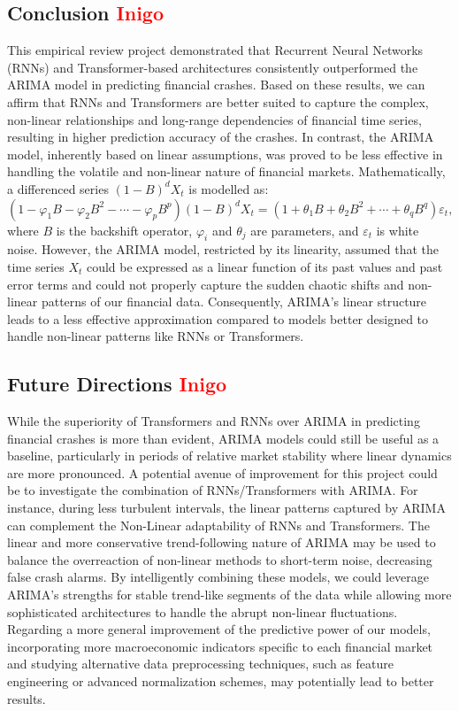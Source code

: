 \documentclass[12pt, letterpaper]{article}
\begin{document}
\subsection*{Conclusion \textcolor{red}{Inigo}}
This empirical review project demonstrated that Recurrent Neural Networks (RNNs) and Transformer-based architectures consistently outperformed the ARIMA model in predicting financial crashes. Based on these results, we can affirm that RNNs and Transformers are better suited to capture the complex, non-linear relationships and long-range dependencies of financial time series, resulting in higher prediction accuracy of the crashes. In contrast, the ARIMA model, inherently based on linear assumptions, was  proved to be less effective in handling the volatile and non-linear nature of financial markets. Mathematically, a differenced series \((1-B)^d X_t\) is modelled as: \[ (1 - \varphi_1 B - \varphi_2 B^2 - \cdots - \varphi_p B^p)(1-B)^d X_t = (1 + \theta_1 B + \theta_2 B^2 + \cdots + \theta_q B^q)\varepsilon_t, \] where \(B\) is the backshift operator, \(\varphi_i\) and \(\theta_j\) are parameters, and \(\varepsilon_t\) is white noise. However, the ARIMA model, restricted by its linearity, assumed that the time series $X_t$ could be expressed as a linear function of its past values and past error terms and could not properly capture the sudden chaotic shifts and non-linear patterns of our financial data. Consequently, ARIMA’s linear structure leads to a less effective approximation compared to models better designed to handle non-linear patterns like RNNs or Transformers.



\subsection*{Future Directions \textcolor{red}{Inigo}}
While the superiority of Transformers and RNNs over ARIMA in predicting financial crashes is more than evident, ARIMA models could still be useful as a baseline, particularly in periods of relative market stability where linear dynamics are more pronounced. A potential avenue of improvement for this project could be to investigate the combination of RNNs/Transformers with ARIMA. For instance, during less turbulent intervals, the linear patterns captured by ARIMA can complement the Non-Linear adaptability of RNNs and Transformers. The linear and more conservative trend-following nature of ARIMA may be used to balance the overreaction of non-linear methods to short-term noise, decreasing false crash alarms. By intelligently combining these models, we could leverage ARIMA’s strengths for stable trend-like segments of the data while allowing more sophisticated architectures to handle the abrupt non-linear fluctuations. Regarding a more general improvement of the predictive power of our models, incorporating more macroeconomic indicators specific to each financial market and studying alternative data preprocessing techniques, such as feature engineering or advanced normalization schemes, may potentially lead to better results.
\end{document}
